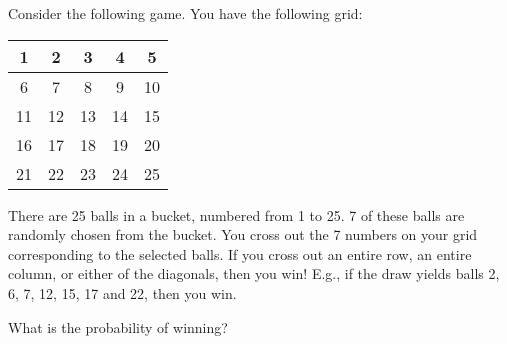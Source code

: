 \documentclass[12pt]{article}
\begin{document}
%
%
%
%

%
%



\begin{problem}{15}
    Consider the following game. You have the following grid:

    \begin{center}
    \begin{tabular}{|c|c|c|c|c|}
        \hline
        1 & 2 & 3 & 4 & 5\\
        \hline
        6 & 7 & 8 & 9 & 10\\
        \hline
        11 & 12 & 13 & 14 & 15\\
        \hline
        16 & 17 & 18 & 19 & 20\\
        \hline
        21 & 22 & 23 & 24 & 25\\
        \hline
    \end{tabular}
\end{center}

    There are 25 balls in a bucket, numbered from 1 to 25. 
    7 of these balls are randomly chosen from the bucket. You cross out the 7 numbers on your grid corresponding to the selected balls. 
    If you cross out an entire row, an entire column, or either of the diagonals, then you win! E.g., if the draw yields balls 2, 6, 7, 12, 15, 17 and 22, then you win.

    What is the probability of winning?
\end{problem}
\end{document}
